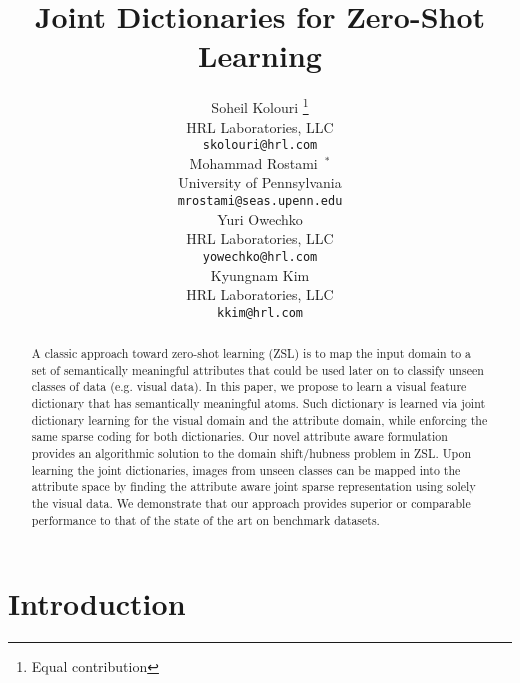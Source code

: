 \documentclass[letterpaper]{article} %
\begin{document}
\title{ Joint Dictionaries for Zero-Shot Learning}
\author{Soheil Kolouri \thanks{Equal contribution} \\
  HRL Laboratories, LLC\\
  \texttt{\small skolouri@hrl.com} \\
  \And
  Mohammad Rostami~$^*$\\
  University of Pennsylvania\\
  \texttt{\small mrostami@seas.upenn.edu} \\
  \And 
  Yuri Owechko\\
  HRL Laboratories, LLC\\
  \texttt{\small yowechko@hrl.com} \\
  \And
  Kyungnam Kim\\
  HRL Laboratories, LLC\\
  \texttt{\small kkim@hrl.com}}
 \maketitle

\begin{abstract}

A classic approach toward zero-shot learning (ZSL) is to map the input domain to a set of semantically meaningful attributes that could be used later on to classify unseen classes of data (e.g. visual data). In this paper, we propose to learn a visual feature dictionary that has semantically meaningful atoms. Such dictionary is learned via joint dictionary learning for the visual domain and the attribute domain, while enforcing the same sparse coding for both dictionaries. Our novel attribute aware formulation provides an algorithmic solution to the domain shift/hubness problem in ZSL. Upon learning the joint dictionaries, images from unseen classes can be mapped into the attribute space by finding the attribute aware joint sparse representation using solely the visual data.  We demonstrate that our approach provides superior or comparable performance to that of the state of the art on benchmark datasets. 
\end{abstract}

\section{Introduction}
\end{document}
